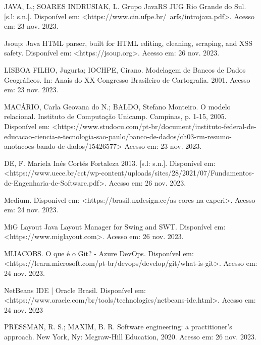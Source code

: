 \documentclass[a4paper,12pt]{article}
\begin{document}
\noindent JAVA, L.; SOARES INDRUSIAK, L. Grupo JavaRS JUG Rio Grande do Sul. [s.l: s.n.]. 
Disponível em: <https://www.cin.ufpe.br/~arfs/introjava.pdf>. Acesso em: 23 nov. 2023. \linebreak

\noindent Jsoup: Java HTML parser, built for HTML editing, cleaning, scraping, and XSS safety. Disponível em: <https://jsoup.org>.
Acesso em: 26 nov. 2023. \linebreak

\noindent LISBOA FILHO, Jugurta; IOCHPE, Cirano. Modelagem de Bancos de Dados Geográficos. In: Anais do XX Congresso Brasileiro de Cartografia. 2001. Acesso em: 23 nov. 2023. \linebreak

\noindent MACÁRIO, Carla Geovana do N.; BALDO, Stefano Monteiro. O modelo relacional. Instituto de Computação Unicamp. Campinas, p. 1-15, 2005. 
Disponível em: <https://www.studocu.com/pt-br/document/instituto-federal-de-educacao-ciencia-e-tecnologia-sao-paulo/banco-de-dados/ch03-rm-resumo-anotacoes-bando-de-dados/15426577> 
Acesso em: 23 nov. 2023. \linebreak

\noindent DE, F. Mariela Inés Cortés Fortaleza 2013. [s.l: s.n.]. 
Disponível em: <https://www.uece.br/cct/wp-content/uploads/sites/28/2021/07/Fundamentos-de-Engenharia-de-Software.pdf>. 
Acesso em: 26 nov. 2023. \linebreak

\noindent Medium. Disponível em: <https://brasil.uxdesign.cc/as-cores-na-experi>. Acesso em: 24 nov. 2023. \linebreak

\noindent MiG Layout Java Layout Manager for Swing and SWT. Disponível em: <https://www.miglayout.com>. Acesso em: 26 nov. 2023. \linebreak

\noindent MIJACOBS. O que é o Git? - Azure DevOps. Disponível em: <https://learn.microsoft.com/pt-br/devops/develop/git/what-is-git>. Acesso em: 24 nov. 2023. \linebreak

\noindent NetBeans IDE | Oracle Brasil. Disponível em: <https://www.oracle.com/br/tools/technologies/netbeans-ide.html>. Acesso em: 24 nov. 2023 \linebreak

\noindent PRESSMAN, R. S.; MAXIM, B. R. Software engineering: a practitioner's approach. New York, Ny: Mcgraw-Hill Education, 2020. Acesso em: 26 nov. 2023. \linebreak
\end{document}
